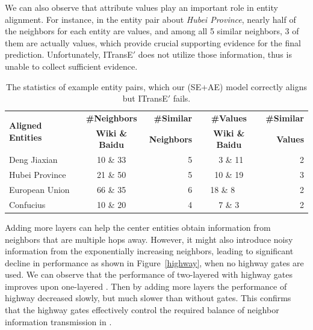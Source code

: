 We can also observe that attribute values play an important role in entity alignment.
For instance, in the entity pair about \textit{Hubei Province}, nearly half of the neighbors for each entity are values, and among all 5 similar neighbors, 3 of them are actually values,
which provide crucial supporting evidence for the final prediction. Unfortunately, ITransE$'$ does not utilize those information, thus is unable to collect sufficient evidence.

\begin{table}
	\centering
	\scriptsize
	\begin{tabular}{lcrcr}
		\toprule
		\multirow{2}{*}{\bf Aligned Entities} & \bf \#Neighbors & \bf \#Similar & \bf \#Values & \bf \#Similar \\
		&\bf  Wiki \& Baidu &\bf  Neighbors &\bf  Wiki \& Baidu &\bf  Values \\
		\midrule
		Deng Jiaxian & 10 \& 33 & 5 & \ 3 \& 11 & 2\\
		Hubei Province & 21 \& 50 & 5 & 10 \& 19 & 3\\
		European Union & 66 \& 35 & 6 & 18 \& 8\ \ \ & 2\\
		Confucius & 10 \& 20 & 4 & 7 \& 3 & 2\\
		\bottomrule
	\end{tabular}
	\caption{The statistics of example entity pairs, which our \HRGCN(SE+AE) model correctly aligns but ITransE$'$ fails.}
	\label{example}
\end{table}


Adding more \HRGCN layers can help the center entities obtain information from neighbors that are multiple hops away. However, it might also introduce noisy information from the exponentially increasing neighbors, leading to significant decline in performance as shown in Figure~\ref{highway}, when no highway gates are used. We can observe that the performance of two-layered \RGCNs with highway gates improves upon one-layered \RGCN. Then by adding more layers the performance of highway \RGCNs decreased slowly, but much slower than \RGCNs without gates. This confirms that the highway gates effectively control the required balance of neighbor information transmission in \RGCNs.

